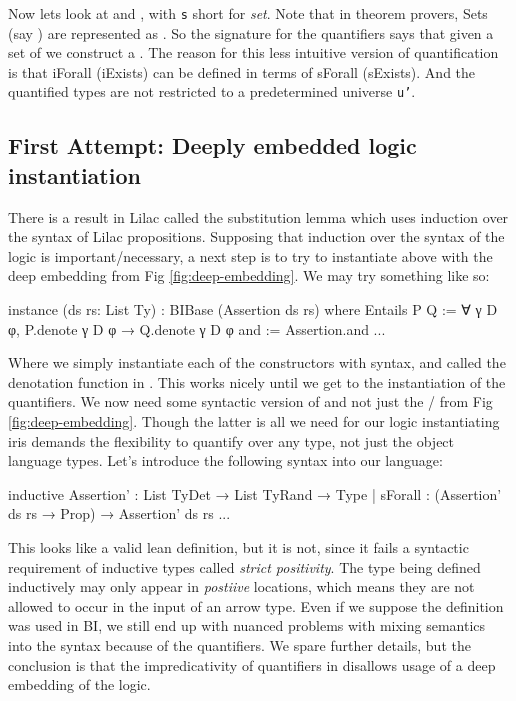 Now lets look at  and , with \texttt{s} short for \emph{set}.  
Note that in theorem provers, Sets (say ) are represented as . So the signature for the quantifiers says that given a set
of  we construct a . The reason for this less intuitive version of quantification is that iForall (iExists) can be defined in terms of sForall
(sExists). And the quantified types are not restricted to a predetermined universe \texttt{u'}.


\subsection{First Attempt: Deeply embedded logic instantiation}
There is a result in Lilac \cite[see Appendix B.10]{lilac} called the substitution lemma which uses induction over the syntax of Lilac propositions. Supposing
that induction over the syntax of the logic is important/necessary, a next step is to try to instantiate  above with the deep embedding from Fig 
\ref{fig:deep-embedding}. We may try something like so:

\begin{leancode}
instance (ds rs: List Ty) : BIBase (Assertion ds rs) where
  Entails P Q    := ∀ γ D φ, P.denote γ D φ → Q.denote γ D φ
  and            := Assertion.and
  ...
\end{leancode}

Where we simply instantiate each of the constructors with syntax, and called the denotation function in . This works nicely until we get to the instantiation
of the quantifiers. We now need some syntactic version of  and not just the 
/ from Fig \ref{fig:deep-embedding}. Though the latter is all we need for our logic instantiating
iris demands the flexibility to quantify over any type, not just the object language types. Let's introduce the following syntax into our
language:

\begin{leancode}
inductive Assertion' : List TyDet → List TyRand → Type
  | sForall : (Assertion' ds rs → Prop) → Assertion' ds rs
  ...
\end{leancode}

This looks like a valid lean definition, but it is not, since it fails a syntactic requirement of inductive types called \emph{strict positivity}.
The type being defined inductively may only appear in \emph{postiive} locations, which means they are not allowed to occur in the input of an arrow
type. Even if we suppose the  definition was used in BI, we still end up with nuanced problems with mixing semantics into the syntax
because of the quantifiers. We spare further details, but the conclusion is that the impredicativity of quantifiers in 
disallows usage of a deep embedding of the logic.

